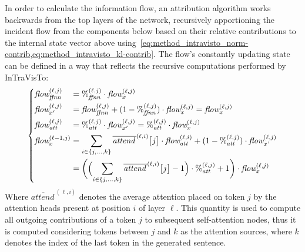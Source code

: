 In order to calculate the information flow, an attribution algorithm works backwards from the top layers of the network, recursively apportioning the incident flow from the components below based on their relative contributions to the internal state vector above using~\cref{eq:method_intravisto_norm-contrib,eq:method_intravisto_kl-contrib}.
The flow's constantly updating state can be defined in a way that reflects the recursive computations performed by InTraVisTo:
\begin{equation}
    \label{eq:method_intravisto_flows}
    \left\{
    \begin{alignedat}{2}
        &\textit{flow}_{\textit{ffnn}}^{(\ell,j)} &&= {\%}_{\textit{ffnn}}^{(\ell,j)} \cdot \textit{flow}_{x}^{(\ell,j)} \\
        &\textit{flow}_{x'}^{(\ell,j)} &&= \textit{flow}_{\textit{ffnn}}^{(\ell,j)} + (1 - {\%}_{\textit{ffnn}}^{(\ell,j)}) \cdot \textit{flow}_{\textit{x}}^{(\ell,j)} = \textit{flow}_{\textit{x}}^{(\ell,j)} \\
        &\textit{flow}_{\textit{att}}^{(\ell,j)} &&= {\%}_{\textit{att}}^{(\ell,j)} \cdot \textit{flow}_{x'}^{(\ell,j)} = {\%}_{\textit{att}}^{(\ell,j)} \cdot \textit{flow}_{x}^{(\ell,j)} \\
        &\textit{flow}_{x}^{(\ell-1,j)} &&= \sum_{i\in\{j,\ldots,k\}}{\overline{\textit{attend}{\,}}^{(\ell,i)}\bigl[j\bigr]}\cdot\textit{flow}_{\textit{att}}^{(\ell,i)} + ( 1 - {\%}_{\textit{att}}^{(\ell,j)})\cdot \textit{flow}_{\textit{x'}}^{(\ell,j)} \\
            &\quad &&= \biggl(\Bigl(\sum_{i\in\{j,\ldots,k\}}\overline{\textit{attend}{\,}}^{(\ell,i)}\bigl[j\bigr] - 1\Bigr)\cdot{\%}_{\textit{att}}^{(\ell,j)} + 1\biggr) \cdot \textit{flow}_{\textit{x}}^{(\ell,j)}
    \end{alignedat}
    \right.
\end{equation}
Where $\overline{\textit{attend}{\,}}^{(\ell,i)}$ denotes the average attention placed on token $j$ by the attention heads present at position $i$ of layer $\ell$.
This quantity is used to compute all outgoing contributions of a token $j$ to subsequent self-attention nodes, thus it is computed considering tokens between $j$ and $k$ as the attention sources, where $k$ denotes the index of the last token in the generated sentence.

